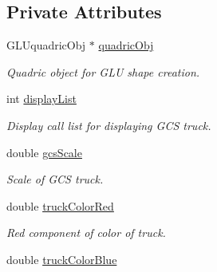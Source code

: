 \subsection*{Private Attributes}
\begin{DoxyCompactItemize}
\item 
\hypertarget{class_g_c_s_display_adca85e2eb3a6bab16a0d2625618a3b65}{
GLUquadricObj $\ast$ \hyperlink{class_g_c_s_display_adca85e2eb3a6bab16a0d2625618a3b65}{quadricObj}}
\label{class_g_c_s_display_adca85e2eb3a6bab16a0d2625618a3b65}

\begin{DoxyCompactList}\small\item\em Quadric object for GLU shape creation. \end{DoxyCompactList}\item 
\hypertarget{class_g_c_s_display_a74d2d05b68dedb897b6309f3f14c6cf1}{
int \hyperlink{class_g_c_s_display_a74d2d05b68dedb897b6309f3f14c6cf1}{displayList}}
\label{class_g_c_s_display_a74d2d05b68dedb897b6309f3f14c6cf1}

\begin{DoxyCompactList}\small\item\em Display call list for displaying GCS truck. \end{DoxyCompactList}\item 
\hypertarget{class_g_c_s_display_ac0ed13b6ffae58843e5d5ac16ed8b037}{
double \hyperlink{class_g_c_s_display_ac0ed13b6ffae58843e5d5ac16ed8b037}{gcsScale}}
\label{class_g_c_s_display_ac0ed13b6ffae58843e5d5ac16ed8b037}

\begin{DoxyCompactList}\small\item\em Scale of GCS truck. \end{DoxyCompactList}\item 
\hypertarget{class_g_c_s_display_ac2cc1b3f16a0d5e35601f11dea6d5320}{
double \hyperlink{class_g_c_s_display_ac2cc1b3f16a0d5e35601f11dea6d5320}{truckColorRed}}
\label{class_g_c_s_display_ac2cc1b3f16a0d5e35601f11dea6d5320}

\begin{DoxyCompactList}\small\item\em Red component of color of truck. \end{DoxyCompactList}\item 
\hypertarget{class_g_c_s_display_a0959a06a9471599ca0260ddba0750bf3}{
double \hyperlink{class_g_c_s_display_a0959a06a9471599ca0260ddba0750bf3}{truckColorBlue}}
\label{class_g_c_s_display_a0959a06a9471599ca0260ddba0750bf3}


\end{DoxyCompactItemize}
